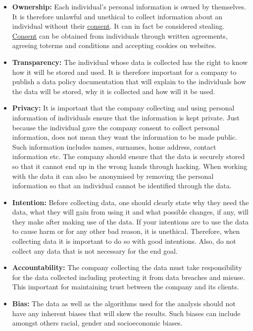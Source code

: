 \documentclass[
]{book}
\begin{document}
\begin{itemize}
\item
  \textbf{Ownership:} Each individual's personal information is owned by themselves. It is therefore unlawful and unethical to collect information about an individual without their \ul{consent}. It can in fact be considered stealing. \ul{Consent} can be obtained from individuals through written agreements, agreeing toterms and conditions and accepting cookies on websites.
\item
  \textbf{Transparency:} The individual whose data is collected has the right to know how it will be stored and used. It is therefore important for a company to publish a data policy documentation that will explain to the individuals how the data will be stored, why it is collected and how will it be used.
\item
  \textbf{Privacy:} It is important that the company collecting and using personal information of individuals ensure that the information is kept private. Just because the individual gave the company consent to collect personal information, does not mean they want the information to be made public. Such information includes names, surnames, home address, contact information etc. The company should ensure that the data is securely stored so that it cannot end up in the wrong hands through hacking. When working with the data it can also be anonymised by removing the personal information so that an individual cannot be identified through the data.
\item
  \textbf{Intention:} Before collecting data, one should clearly state why they need the data, what they will gain from using it and what possible changes, if any, will they make after making use of the data. If your intentions are to use the data to cause harm or for any other bad reason, it is unethical. Therefore, when collecting data it is important to do so with good intentions. Also, do not collect any data that is not necessary for the end goal.
\item
  \textbf{Accountability:} The company collecting the data must take responsibility for the data collected including protecting it from data breaches and misuse. This important for maintaining trust between the company and its clients.
\item
  \textbf{Bias:} The data as well as the algorithms used for the analysis should not have any inherent biases that will skew the results. Such biases can include amongst others racial, gender and socioeconomic biases.
\end{itemize}
\end{document}
